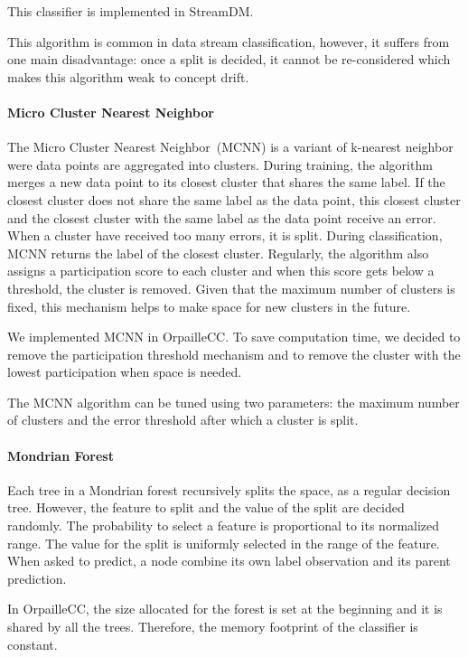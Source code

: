 This classifier is implemented in StreamDM.

This algorithm is common in data stream
classification, however, it suffers from one main
disadvantage: once a split is decided, it cannot
be re-considered which makes this algorithm weak
to concept drift.

\paragraph{Micro Cluster Nearest Neighbor~\cite{mc-nn}}
The Micro Cluster Nearest Neighbor~(MCNN) is a
variant of k-nearest neighbor were data points are
aggregated into clusters.  During training, the
algorithm merges a new data point to its closest
cluster that shares the same label. If the closest
cluster does not share the same label as the data
point, this closest cluster and the closest
cluster with the same label as the data point
receive an error. When a cluster have received too
many errors, it is split. During classification,
MCNN returns the label of the closest cluster.
Regularly, the algorithm also assigns a
participation score to each cluster and when this
score gets below a threshold, the cluster is
removed. Given that the maximum number of clusters
is fixed, this mechanism helps to make space for
new clusters in the future.  

We implemented MCNN in OrpailleCC. To save computation time, we decided to remove the
participation threshold mechanism and to remove the
cluster with the lowest participation
when space is needed. 

The MCNN algorithm can be tuned using two
parameters: the maximum number of clusters and the
error threshold after which a cluster is split.


\paragraph{Mondrian Forest~\cite{mondrian2014}}
Each tree in a Mondrian forest recursively
splits the space, as a regular decision tree.
However, the feature to split and the value of the
split are decided randomly. The probability to select a feature is 
proportional to its normalized range. The value for the split is
uniformly selected in the range of the feature. When asked to predict, a node
combine its own label observation and its parent prediction.

In OrpailleCC, the size allocated for the forest
is set at the beginning and it is shared by all
the trees.  Therefore, the memory footprint of the
classifier is constant.

